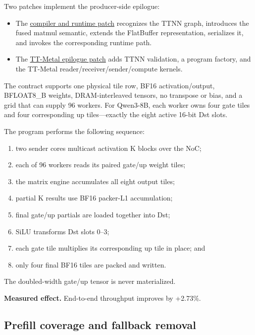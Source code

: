 \documentclass[
  10pt,
  american,
  10pt,
  letterpaper]{article}
\providecommand{\tightlist}{%
  \setlength{\itemsep}{0pt}\setlength{\parskip}{0pt}}
\begin{document}
Two patches implement the producer-side epilogue:

\begin{itemize}
\tightlist
\item
  The
  \href{../../third_party/tt_xla/tt_mlir_fuse_matmul_swiglu.patch}{compiler
  and runtime patch} recognizes the TTNN graph, introduces the fused
  matmul semantic, extends the FlatBuffer representation, serializes it,
  and invokes the corresponding runtime path.
\item
  The
  \href{../../third_party/tt_metal/matmul_swiglu_epilogue.patch}{TT-Metal
  epilogue patch} adds TTNN validation, a program factory, and the
  TT-Metal reader/receiver/sender/compute kernels.
\end{itemize}

The contract supports one physical tile row, BF16 activation/output,
BFLOAT8\_B weights, DRAM-interleaved tensors, no transpose or bias, and
a grid that can supply 96 workers. For Qwen3-8B, each worker owns four
gate tiles and four corresponding up tiles---exactly the eight active
16-bit Dst slots.

The program performs the following sequence:

\begin{enumerate}
\def\labelenumi{\arabic{enumi}.}
\tightlist
\item
  two sender cores multicast activation K blocks over the NoC;
\item
  each of 96 workers reads its paired gate/up weight tiles;
\item
  the matrix engine accumulates all eight output tiles;
\item
  partial K results use BF16 packer-L1 accumulation;
\item
  final gate/up partials are loaded together into Dst;
\item
  SiLU transforms Dst slots 0--3;
\item
  each gate tile multiplies its corresponding up tile in place; and
\item
  only four final BF16 tiles are packed and written.
\end{enumerate}

The doubled-width gate/up tensor is never materialized.

\textbf{Measured effect.} End-to-end throughput improves by +2.73\%.

\hypertarget{prefill-coverage-and-fallback-removal}{%
\subsection{Prefill coverage and fallback
removal}\label{prefill-coverage-and-fallback-removal}}
\end{document}
